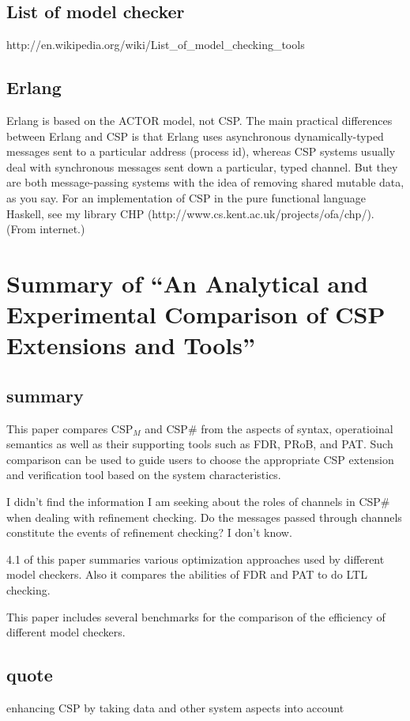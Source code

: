 \documentclass{llncs}
\newcommand{\cspm}{CSP$_M$}
\newcommand{\csps}{CSP\#}
\newcommand{\fdr}{FDR}
\newcommand{\pat}{PAT}
\newcommand{\prob}{PRoB}
\begin{document}
\subsection{List of model checker}
http://en.wikipedia.org/wiki/List\_of\_model\_checking\_tools

\subsection{Erlang}
Erlang is based on the ACTOR model, not CSP. The main practical differences
between Erlang and CSP is that Erlang uses asynchronous dynamically-typed
messages sent to a particular address (process id), whereas CSP systems usually
deal with synchronous messages sent down a particular, typed channel. But
they are both message-passing systems with the idea of removing shared mutable
data, as you say. For an implementation of CSP in the pure functional language
Haskell, see my library CHP (http://www.cs.kent.ac.uk/projects/ofa/chp/).
(From internet.)


\newpage
\section{Summary of ``An Analytical and Experimental Comparison of CSP 
Extensions and Tools''\cite{Shi2012Analytical}}
  \label{section:cspm_vs_csps}
\subsection{summary}
This paper compares \cspm{} and \csps{} from the aspects of syntax, operatioinal
semantics as well as their supporting tools such as \fdr{}, \prob{}, and
\pat{}. Such comparison can be used to guide users to choose the appropriate CSP
extension and verification tool based on the system characteristics.

I didn't find the information I am seeking about the roles of channels in
\csps{} when dealing with refinement checking. Do the messages passed through
channels constitute the events of refinement checking? I don't know.

4.1 of this paper summaries various optimization approaches used by different
model checkers. Also it compares the abilities of \fdr{} and \pat{} to do LTL
checking.

This paper includes several benchmarks for the comparison of the efficiency of
different model checkers.


\subsection{quote}
enhancing CSP by taking data and other system aspects into account
\end{document}
